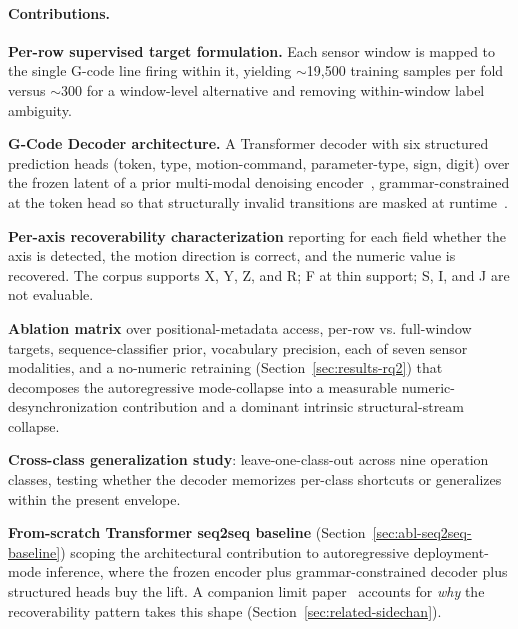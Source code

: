 \documentclass[sensors,article,submit,moreauthors,pdftex]{Definitions/mdpi}
\newcommand{\modelname}{G-Code Decoder}
\begin{document}
\paragraph{Contributions.}
\begin{enumerate}[label=\textbf{(\arabic*)}, leftmargin=*]\let\item\olditem
\item \textbf{Per-row supervised target formulation.} Each sensor window is mapped to the single G-code line firing within it, yielding $\sim$19{,}500 training samples per fold versus $\sim$300 for a window-level alternative and removing within-window label ambiguity.

\item \textbf{\modelname{} architecture.} A Transformer decoder with six structured prediction heads (token, type, motion-command, parameter-type, sign, digit) over the frozen latent of a prior multi-modal denoising encoder~\cite{encoder_paper}, grammar-constrained at the token head so that structurally invalid transitions are masked at runtime~\cite{picard,outlines,xgrammar}.

\item \textbf{Per-axis recoverability characterization} reporting for each field whether the axis is detected, the motion direction is correct, and the numeric value is recovered. The corpus supports X, Y, Z, and R; F at thin support; S, I, and J are not evaluable.

\item \textbf{Ablation matrix} over positional-metadata access, per-row vs. full-window targets, sequence-classifier prior, vocabulary precision, each of seven sensor modalities, and a no-numeric retraining (Section~\ref{sec:results-rq2}) that decomposes the autoregressive mode-collapse into a measurable numeric-desynchronization contribution and a dominant intrinsic structural-stream collapse.

\item \textbf{Cross-class generalization study}: leave-one-class-out across nine operation classes, testing whether the decoder memorizes per-class shortcuts or generalizes within the present envelope.

\item \textbf{From-scratch Transformer seq2seq baseline} (Section~\ref{sec:abl-seq2seq-baseline}) scoping the architectural contribution to autoregressive deployment-mode inference, where the frozen encoder plus grammar-constrained decoder plus structured heads buy the lift. A companion limit paper~\cite{paperB_entropy} accounts for \emph{why} the recoverability pattern takes this shape (Section~\ref{sec:related-sidechan}).
\end{enumerate}
\end{document}
